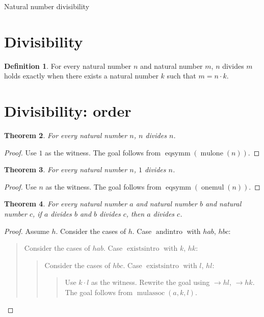 \documentclass[11pt]{article}
\newtheorem{theorem}{Theorem}[section]
\theoremstyle{definition}
\newtheorem{definition}[theorem]{Definition}
\begin{document}
\begin{center}
{\LARGE Natural number divisibility}
\end{center}
\section{Divisibility}
\label{ll:divisibility:definition}
\begin{definition}
\label{ll:divisibility:divides}
For every natural number \(n\) and natural number \(m\), \(n\) divides \(m\) holds exactly when there exists a natural number \(k\) such that \(m = n \cdot k\).
\end{definition}
\section{Divisibility: order}
\label{ll:divisibility:properties}
\begin{theorem}
\label{ll:divisibility:divides-refl}
For every natural number \(n\), \(n\) divides \(n\).
\end{theorem}
\begin{proof}
Use \(1\) as the witness.
The goal follows from \(\operatorname{eqsymm}(\operatorname{mulone}(n))\).
\end{proof}
\begin{theorem}
\label{ll:divisibility:one-divides}
For every natural number \(n\), \(1\) divides \(n\).
\end{theorem}
\begin{proof}
Use \(n\) as the witness.
The goal follows from \(\operatorname{eqsymm}(\operatorname{onemul}(n))\).
\end{proof}
\begin{theorem}
\label{ll:divisibility:divides-trans}
For every natural number \(a\) and natural number \(b\) and natural number \(c\), if \(a\) divides \(b\) and \(b\) divides \(c\), then \(a\) divides \(c\).
\end{theorem}
\begin{proof}
Assume \(h\).
Consider the cases of \(h\).
Case \(\operatorname{andintro}\) with \(hab\), \(hbc\):
\begin{quote}
Consider the cases of \(hab\).
Case \(\operatorname{existsintro}\) with \(k\), \(hk\):
\begin{quote}
Consider the cases of \(hbc\).
Case \(\operatorname{existsintro}\) with \(l\), \(hl\):
\begin{quote}
Use \(k \cdot l\) as the witness.
Rewrite the goal using \(\rightarrow hl\), \(\rightarrow hk\).
The goal follows from \(\operatorname{mulassoc}(a, k, l)\).
\end{quote}
\end{quote}
\end{quote}
\end{proof}
\end{document}
